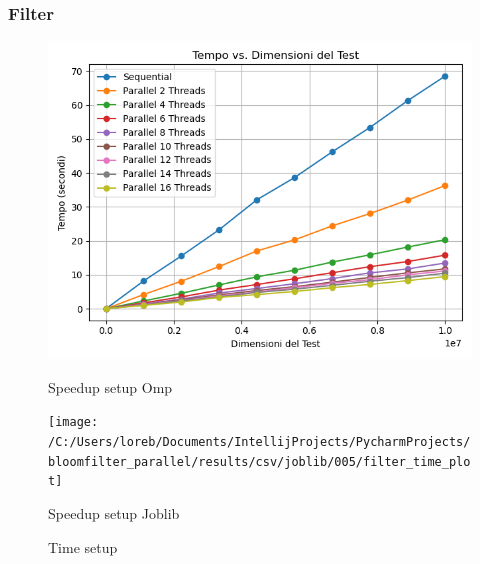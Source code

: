 \documentclass[11pt]{article}
\begin{document}
    \subsubsection{Filter}\label{subsubsec:fpr-005-filter}
    \begin{figure}[H]
        \centering
        \includegraphics[width=\linewidth]{omp/005/filter_time_plot}
            \caption{Speedup setup Omp}\label{fig:005-filter_time_omp}
        \endminipage\hfill
        \texttt{[image: /C:/Users/loreb/Documents/IntellijProjects/PycharmProjects/bloomfilter\_parallel/results/csv/joblib/005/filter\_time\_plot]}
            \caption{Speedup setup Joblib}\label{fig:005-filter_time_joblib}
        \endminipage\hfill
        \caption{Time setup}
    \end{figure}
\end{document}
